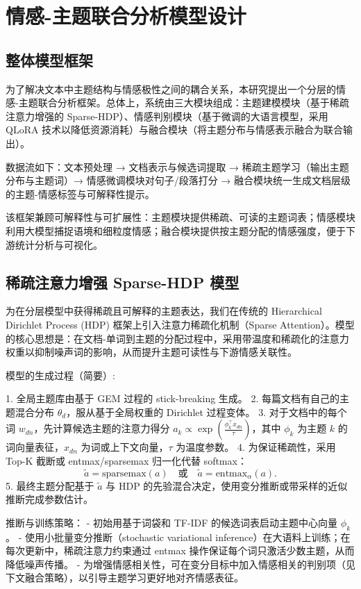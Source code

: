 \chapter{情感-主题联合分析模型设计}
\label{ch:model}

\section{整体模型框架}
\label{sec:overall_framework}
为了解决文本中主题结构与情感极性之间的耦合关系，本研究提出一个分层的情感-主题联合分析框架。总体上，系统由三大模块组成：主题建模模块（基于稀疏注意力增强的 Sparse-HDP）、情感判别模块（基于微调的大语言模型，采用 QLoRA 技术以降低资源消耗）与融合模块（将主题分布与情感表示融合为联合输出）。

数据流如下：文本预处理 → 文档表示与候选词提取 → 稀疏主题学习（输出主题分布与主题词）→ 情感微调模块对句子/段落打分 → 融合模块统一生成文档层级的主题-情感标签与可解释性提示。

该框架兼顾可解释性与可扩展性：主题模块提供稀疏、可读的主题词表；情感模块利用大模型捕捉语境和细粒度情感；融合模块提供按主题分配的情感强度，便于下游统计分析与可视化。

\section{稀疏注意力增强 Sparse-HDP 模型}
\label{sec:sparse_hdp}
为在分层模型中获得稀疏且可解释的主题表达，我们在传统的 Hierarchical Dirichlet Process (HDP) 框架上引入注意力稀疏化机制（Sparse Attention）。模型的核心思想是：在文档-单词到主题的分配过程中，采用带温度和稀疏化的注意力权重以抑制噪声词的影响，从而提升主题可读性与下游情感关联性。

模型的生成过程（简要）:

1. 全局主题库由基于 GEM 过程的 stick-breaking 生成。
2. 每篇文档有自己的主题混合分布 $\theta_d$，服从基于全局权重的 Dirichlet 过程变体。
3. 对于文档中的每个词 $w_{dn}$，先计算候选主题的注意力得分 $a_{k}\propto\exp\left(\frac{\phi_k^{\top} x_{dn}}{\tau}\right)$，其中 $\phi_k$ 为主题 $k$ 的词向量表征，$x_{dn}$ 为词或上下文向量，$\tau$ 为温度参数。
4. 为保证稀疏性，采用 Top-K 截断或 entmax/sparsemax 归一化代替 softmax：
$$\tilde{a}=\mathrm{sparsemax}(a)\quad\text{或}\quad\tilde{a}=\mathrm{entmax}_\alpha(a).$$
5. 最终主题分配基于 $\tilde{a}$ 与 HDP 的先验混合决定，使用变分推断或带采样的近似推断完成参数估计。

推断与训练策略：
- 初始用基于词袋和 TF-IDF 的候选词表启动主题中心向量 $\phi_k$。
- 使用小批量变分推断（stochastic variational inference）在大语料上训练；在每次更新中，稀疏注意力约束通过 entmax 操作保证每个词只激活少数主题，从而降低噪声传播。
- 为增强情感相关性，可在变分目标中加入情感相关的判别项（见下文融合策略），以引导主题学习更好地对齐情感表征。

